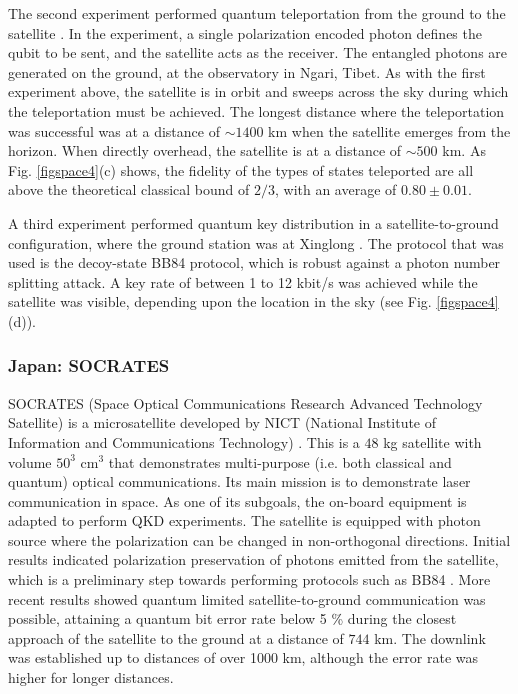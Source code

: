 \documentclass[aps,rmp,reprint,amsmath,amssymb,graphicx,longbibliography]{revtex4-1}
\begin{document}
The second experiment performed quantum teleportation from the ground to the satellite \cite{ren2017ground}. In the experiment, a single polarization encoded photon defines the qubit to be sent, and the satellite acts as the receiver.  The entangled photons are generated on the ground, at the observatory in Ngari, Tibet. As with the first experiment above, the satellite is in orbit and sweeps across the sky during which the teleportation must be achieved.  The longest distance where the teleportation was successful was at a distance of $ \sim 1400 $ km when the satellite emerges from the horizon.  When directly overhead, the satellite is at a distance of $ \sim 500 $ km.  As Fig.  \ref{figspace4}(c) shows, the fidelity of the types of states teleported are all above the theoretical classical bound of $2/3$, with an average of $ 0.80 \pm 0.01 $.  

A third experiment performed quantum key distribution in a satellite-to-ground configuration, where the ground station was at Xinglong \cite{liao2017satellite}. The protocol that was used is the decoy-state BB84 protocol, which is robust against a photon number splitting attack.  A key rate of between 1 to 12 kbit/s was achieved while the satellite was visible, depending upon the location in the sky (see Fig. \ref{figspace4}(d)).  


















\subsubsection{Japan: SOCRATES}

SOCRATES (Space Optical Communications Research Advanced Technology Satellite) is a microsatellite developed by NICT (National Institute of Information and Communications Technology) \cite{horiuchi2015view,toyoshima2015current,takenaka2017}. This is a $ 48 $ kg satellite with volume $ 50^3 $ cm$^3$ that demonstrates multi-purpose (i.e. both classical and quantum) optical communications. Its main mission is to demonstrate laser communication in space. As one of its subgoals, the on-board equipment is adapted to perform QKD experiments. The satellite is equipped with photon source where the polarization can be changed in non-orthogonal directions.  
Initial results indicated polarization preservation of photons emitted from the satellite, which is a preliminary step towards performing protocols such as BB84 \cite{carrasco2016leo}. More recent results showed quantum limited  satellite-to-ground communication was possible, attaining a quantum bit error rate below 5 \% \cite{takenaka2017} during the closest approach of the satellite to the ground at a distance of $ 744 $ km.  The downlink was established up to distances of over 1000 km, although the error rate was higher for longer distances.  
\end{document}
